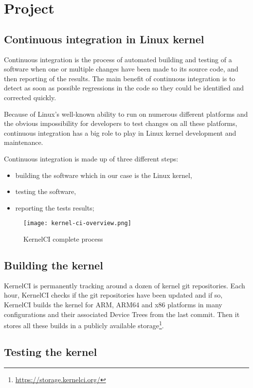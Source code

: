 \section{Project}
\subsection{Continuous integration in Linux kernel}

Continuous integration is the process of automated building and testing of a software when one or multiple changes have been made to its source code, and then reporting of the results. The main benefit of continuous integration is to detect as soon as possible regressions in the code so they could be identified and corrected quickly.

Because of Linux's well-known ability to run on numerous different platforms and the obvious impossibility for developers to test changes on all these platforms, continuous integration has a big role to play in Linux kernel development and maintenance.

Continuous integration is made up of three different steps:
\begin{itemize}
  \item building the software which in our case is the Linux kernel,
  \item testing the software,
  \item reporting the tests results;
\end{itemize}

\begin{figure}[H]
  \texttt{[image: kernel-ci-overview.png]}
  \caption{KernelCI complete process}
\end{figure}

\subsection{Building the kernel}

KernelCI is permanently tracking around a dozen of kernel git repositories. Each hour, KernelCI checks if the git repositories have been updated and if so, KernelCI builds the kernel for ARM, ARM64 and x86 platforms in many configurations and their associated Device Trees from the last commit. Then it stores all these builds in a publicly available storage\footnote{\url{https://storage.kernelci.org/}}.

\subsection{Testing the kernel}

